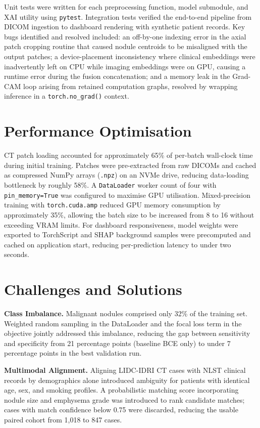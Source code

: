 {Unit tests were written for each preprocessing function, model submodule, and XAI utility
using \texttt{pytest}. Integration tests verified the end-to-end pipeline from DICOM ingestion
to dashboard rendering with synthetic patient records. Key bugs identified and resolved
included: an off-by-one indexing error in the axial patch cropping routine that caused nodule
centroids to be misaligned with the output patches; a device-placement inconsistency where
clinical embeddings were inadvertently left on CPU while imaging embeddings were on GPU,
causing a runtime error during the fusion concatenation; and a memory leak in the Grad-CAM
loop arising from retained computation graphs, resolved by wrapping inference in a
\texttt{torch.no\_grad()} context.

\section{Performance Optimisation}

CT patch loading accounted for approximately 65\% of per-batch wall-clock time during initial
training. Patches were pre-extracted from raw DICOMs and cached as compressed NumPy arrays
(\texttt{.npz}) on an NVMe drive, reducing data-loading bottleneck by roughly 58\%. A
\texttt{DataLoader} worker count of four with \texttt{pin\_memory=True} was configured to
maximise GPU utilisation. Mixed-precision training with \texttt{torch.cuda.amp} reduced GPU
memory consumption by approximately 35\%, allowing the batch size to be increased from 8 to
16 without exceeding VRAM limits. For dashboard responsiveness, model weights were exported
to TorchScript and SHAP background samples were precomputed and cached on application start,
reducing per-prediction latency to under two seconds.

\section{Challenges and Solutions}

\textbf{Class Imbalance.}
Malignant nodules comprised only 32\% of the training set. Weighted random sampling in the
DataLoader and the focal loss term in the objective jointly addressed this imbalance, reducing
the gap between sensitivity and specificity from 21 percentage points (baseline BCE only) to
under 7 percentage points in the best validation run.

\textbf{Multimodal Alignment.}
Aligning LIDC-IDRI CT cases with NLST clinical records by demographics alone introduced
ambiguity for patients with identical age, sex, and smoking profiles. A probabilistic matching
score incorporating nodule size and emphysema grade was introduced to rank candidate matches;
cases with match confidence below 0.75 were discarded, reducing the usable paired cohort from
1{,}018 to 847 cases.

}
